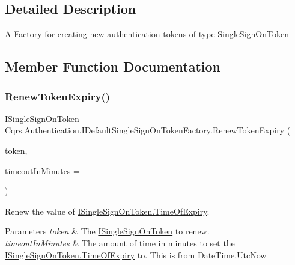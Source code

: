 \subsection{Detailed Description}
A Factory for creating new authentication tokens of type \hyperlink{classCqrs_1_1Authentication_1_1SingleSignOnToken}{Single\+Sign\+On\+Token} 



\subsection{Member Function Documentation}
\mbox{\label{interfaceCqrs_1_1Authentication_1_1IDefaultSingleSignOnTokenFactory_aff3e7060705a3a8e021c1182ce101b33_aff3e7060705a3a8e021c1182ce101b33}} 
\subsubsection{\texorpdfstring{Renew\+Token\+Expiry()}{RenewTokenExpiry()}}
{\footnotesize\ttfamily \hyperlink{interfaceCqrs_1_1Authentication_1_1ISingleSignOnToken}{I\+Single\+Sign\+On\+Token} Cqrs.\+Authentication.\+I\+Default\+Single\+Sign\+On\+Token\+Factory.\+Renew\+Token\+Expiry (\begin{DoxyParamCaption}\item[{\hyperlink{interfaceCqrs_1_1Authentication_1_1ISingleSignOnToken}{I\+Single\+Sign\+On\+Token}}]{token,  }\item[{int}]{timeout\+In\+Minutes = {} }\end{DoxyParamCaption})}



Renew the value of \hyperlink{interfaceCqrs_1_1Authentication_1_1ISingleSignOnToken_a50af484569cc78f88acb01f1938a7cd8_a50af484569cc78f88acb01f1938a7cd8}{I\+Single\+Sign\+On\+Token.\+Time\+Of\+Expiry}. 


\begin{DoxyParams}{Parameters}
{\em token} & The \hyperlink{interfaceCqrs_1_1Authentication_1_1ISingleSignOnToken}{I\+Single\+Sign\+On\+Token} to renew.\\
\hline
{\em timeout\+In\+Minutes} & The amount of time in minutes to set the \hyperlink{interfaceCqrs_1_1Authentication_1_1ISingleSignOnToken_a50af484569cc78f88acb01f1938a7cd8_a50af484569cc78f88acb01f1938a7cd8}{I\+Single\+Sign\+On\+Token.\+Time\+Of\+Expiry} to. This is from Date\+Time.\+Utc\+Now\\
\hline
\end{DoxyParams}
